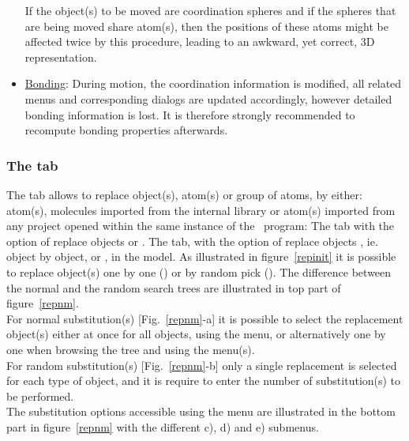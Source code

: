 \begin{itemize}
If the object(s) to be moved are coordination spheres and if the spheres that are being moved share atom(s), then the positions of these atoms 
might be affected twice by this procedure, leading to an awkward, yet correct, 3D representation.
\item \uline{Bonding}: During motion, the coordination information is modified, all related menus and corresponding dialogs are updated accordingly, 
however detailed bonding information is lost. It is therefore strongly recommended to recompute bonding properties afterwards. 
\end{itemize}

\clearpage

\subsubsection*{The  tab}
\label{replsel}

The  tab allows to replace object(s), atom(s) or group of atoms, by either: atom(s), 
molecules imported from the internal library or atom(s) imported from any project opened within the same instance of the \atomes\ program:  
{The  tab with the option of replace objects  or .}
{The  tab, with the option of replace objects , ie. object by object, or , in the model.}
\laf As illustrated in figure~\ref{repinit} it is possible to replace object(s) one by one () or by random pick (). 
The difference between the normal and the random search trees are illustrated in top part of figure~\ref{repnm}. \\
For normal substitution(s) [Fig.~\ref{repnm}-a] it is possible to select the replacement object(s) either at once for all objects, using the  menu, 
or alternatively one by one when browsing the tree and using the  menu(s). \\
For random substitution(s) [Fig.~\ref{repnm}-b] only a single replacement is selected for each type of object, and it is require to enter the number of substitution(s) to be performed. \\
The substitution options accessible using the  menu are illustrated in the bottom part in figure~\ref{repnm} with the different  c),  d) and  e) submenus. 
\clearpage
\repnmfig

